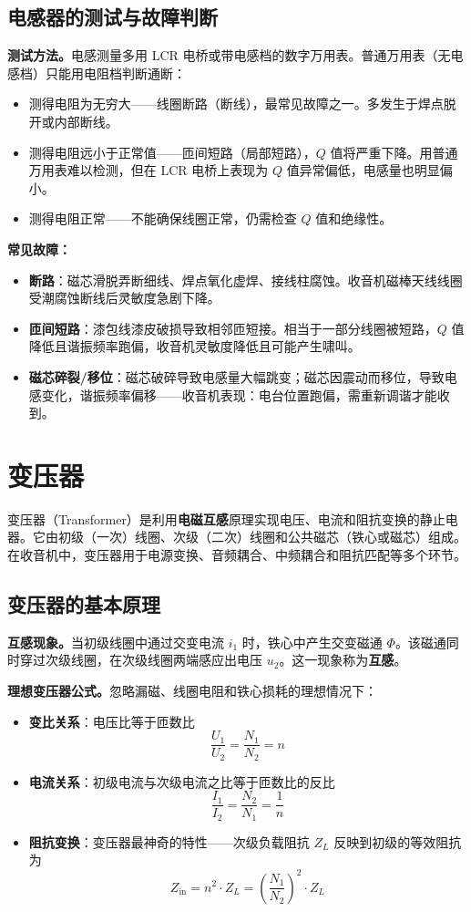 \documentclass[12pt,UTF8]{ctexbook}
\begin{document}
\subsection{电感器的测试与故障判断}

\textbf{测试方法。}电感测量多用 LCR 电桥或带电感档的数字万用表。普通万用表（无电感档）只能用电阻档判断通断：
\begin{itemize}
  \item 测得电阻为无穷大——线圈断路（断线），最常见故障之一。多发生于焊点脱开或内部断线。
  \item 测得电阻远小于正常值——匝间短路（局部短路），$Q$ 值将严重下降。用普通万用表难以检测，但在 LCR 电桥上表现为 $Q$ 值异常偏低，电感量也明显偏小。
  \item 测得电阻正常——不能确保线圈正常，仍需检查 $Q$ 值和绝缘性。
\end{itemize}
\textbf{常见故障：}
\begin{itemize}
  \item \textbf{断路}：磁芯滑脱弄断细线、焊点氧化虚焊、接线柱腐蚀。收音机磁棒天线线圈受潮腐蚀断线后灵敏度急剧下降。
  \item \textbf{匝间短路}：漆包线漆皮破损导致相邻匝短接。相当于一部分线圈被短路，$Q$ 值降低且谐振频率跑偏，收音机灵敏度降低且可能产生啸叫。
  \item \textbf{磁芯碎裂/移位}：磁芯破碎导致电感量大幅跳变；磁芯因震动而移位，导致电感变化，谐振频率偏移——收音机表现：电台位置跑偏，需重新调谐才能收到。
\end{itemize}

\section{变压器}
\label{sec:transformer}

变压器（Transformer）是利用\textbf{电磁互感}原理实现电压、电流和阻抗变换的静止电器。它由初级（一次）线圈、次级（二次）线圈和公共磁芯（铁心或磁芯）组成。在收音机中，变压器用于电源变换、音频耦合、中频耦合和阻抗匹配等多个环节。

\subsection{变压器的基本原理}

\textbf{互感现象。}当初级线圈中通过交变电流 $i_1$ 时，铁心中产生交变磁通 $\Phi$。该磁通同时穿过次级线圈，在次级线圈两端感应出电压 $u_2$。这一现象称为\textbf{互感}。

\textbf{理想变压器公式。}忽略漏磁、线圈电阻和铁心损耗的理想情况下：
\begin{itemize}
  \item \textbf{变比关系}：电压比等于匝数比
  \[
  \frac{U_1}{U_2} = \frac{N_1}{N_2} = n
  \]
  \item \textbf{电流关系}：初级电流与次级电流之比等于匝数比的反比
  \[
  \frac{I_1}{I_2} = \frac{N_2}{N_1} = \frac{1}{n}
  \]
  \item \textbf{阻抗变换}：变压器最神奇的特性——次级负载阻抗 $Z_L$ 反映到初级的等效阻抗为
  \[
  Z_{\text{in}} = n^2 \cdot Z_L = \left(\frac{N_1}{N_2}\right)^2 \cdot Z_L
  \]
\end{itemize}
\end{document}
